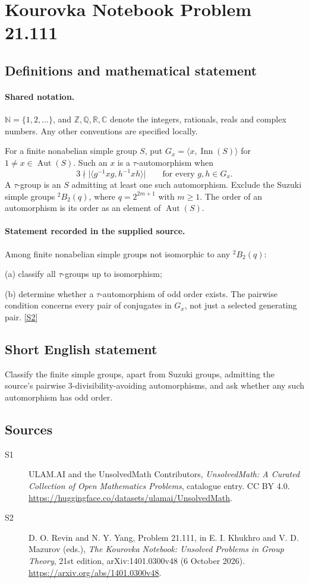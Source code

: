 \documentclass[11pt]{article}
\newcommand{\sref}[2]{\hyperlink{source:#1:#2}{[S#2]}}
\begin{document}
\section{Kourovka Notebook Problem 21.111}\label{statement}

\subsection{Definitions and mathematical statement}

\paragraph{Shared notation.}$\mathbb N=\{1,2,\ldots\}$, and $\mathbb Z,\mathbb Q,\mathbb R,\mathbb C$ denote the integers, rationals, reals and complex numbers. Any other conventions are specified locally.


For a finite nonabelian simple group $S$, put $G_x=\langle x,\operatorname{Inn}(S)\rangle$ for $1\ne x\in\operatorname{Aut}(S)$. Such an $x$ is a $\tau$-automorphism when
\[
 3\nmid\bigl|\langle g^{-1}xg,h^{-1}xh\rangle\bigr|
 \qquad\text{for every }g,h\in G_x.
\]
A $\tau$-group is an $S$ admitting at least one such automorphism. Exclude the Suzuki simple groups ${}^2B_2(q)$, where $q=2^{2m+1}$ with $m\geq1$. The order of an automorphism is its order as an element of $\operatorname{Aut}(S)$.
\paragraph{Statement recorded in the supplied source.}
Among finite nonabelian simple groups not isomorphic to any ${}^2B_2(q)$:

(a) classify all $\tau$-groups up to isomorphism;

(b) determine whether a $\tau$-automorphism of odd order exists. The pairwise condition concerns every pair of conjugates in $G_x$, not just a selected generating pair. \sref{statement}{2}
\subsection{Short English statement}
Classify the finite simple groups, apart from Suzuki groups, admitting the source’s pairwise 3-divisibility-avoiding automorphisms, and ask whether any such automorphism has odd order.
\subsection{Sources}
\begin{description}
\item[\hypertarget{source:statement:1}{S1}] ULAM.AI and the UnsolvedMath Contributors, \emph{UnsolvedMath: A Curated Collection of Open Mathematics Problems}, catalogue entry. CC BY 4.0. \url{https://huggingface.co/datasets/ulamai/UnsolvedMath}.
\item[\hypertarget{source:statement:2}{S2}] D. O. Revin and N. Y. Yang, Problem 21.111, in E. I. Khukhro and V. D. Mazurov (eds.), \emph{The Kourovka Notebook: Unsolved Problems in Group Theory}, 21st edition, arXiv:1401.0300v48 (6 October 2026). \url{https://arxiv.org/abs/1401.0300v48}.
\end{description}
\label{end:statement}
\end{document}
